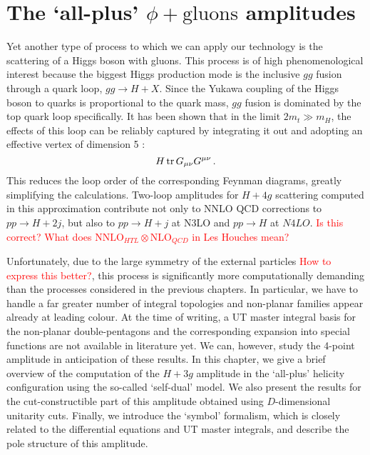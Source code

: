 \documentclass[main.tex]{subfiles}
\begin{document}
\chapter{The `all-plus' $\phi+\text{gluons}$ amplitudes}
Yet another type of process to which we can apply our technology is the scattering of a Higgs boson with gluons. This process is of high phenomenological interest because the biggest Higgs production mode is the inclusive $gg$ fusion through a quark loop, $gg \rightarrow H + X$. Since the Yukawa coupling of the Higgs boson to quarks is proportional to the quark mass, $gg$ fusion is dominated by the top quark loop specifically. It has been shown that in the limit $2m_t \gg m_H$, the effects of this loop can be reliably captured by integrating it out and adopting an effective vertex of dimension 5 \cite{Wilczek:1977, Djouadi:1991}: 
\begin{equation}
    H \operatorname{\rm tr} G_{\mu\nu} G^{\mu\nu} \,.
\end{equation}
This reduces the loop order of the corresponding Feynman diagrams, greatly simplifying the calculations. Two-loop amplitudes for $H+4g$ scattering computed in this approximation contribute not only to NNLO QCD corrections to $pp \rightarrow H+2j$, but also to $pp \rightarrow H+j$ at N3LO and $pp \rightarrow H$ at $N4LO$.
\textcolor{red}{Is this correct? What does $\text{NNLO}_{HTL} \otimes \text{NLO}_{QCD}$ in Les Houches mean?}

Unfortunately, due to the large symmetry of the external particles \textcolor{red}{How to express this better?}, this process is significantly more computationally demanding than the processes considered in the previous chapters. In particular, we have to handle a far greater number of integral topologies and non-planar families appear already at leading colour. At the time of writing, a UT master integral basis for the non-planar double-pentagons and the corresponding expansion into special functions are not available in literature yet. We can, however, study the 4-point amplitude in anticipation of these results. In this chapter, we give a brief overview of the computation of the $H+3g$ amplitude in the `all-plus' helicity configuration using the so-called `self-dual' model. We also present the results for the cut-constructible part of this amplitude obtained using $D$-dimensional unitarity cuts. Finally, we introduce the `symbol' formalism, which is closely related to the differential equations and UT master integrals, and describe the pole structure of this amplitude.
\end{document}
